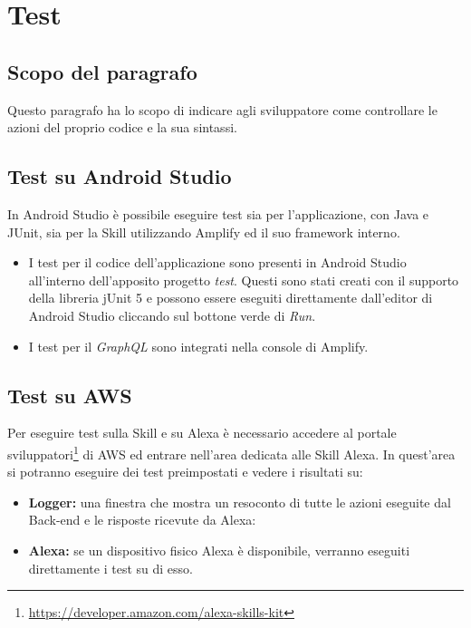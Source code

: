 \pagebreak

\section{Test}
\label{sec:test}
\subsection{Scopo del paragrafo}
Questo paragrafo ha lo scopo di indicare agli sviluppatore come controllare le azioni del proprio codice e la sua sintassi.

\subsection{Test su Android Studio}
In Android Studio è possibile eseguire test sia per l'applicazione, con Java e JUnit, sia per la Skill utilizzando Amplify ed il suo framework interno.
\begin{itemize}
    \item I test per il codice dell'applicazione sono presenti in Android Studio all'interno dell'apposito progetto \emph{test}. Questi sono stati creati con il supporto della libreria jUnit 5 e possono essere eseguiti direttamente dall'editor di Android Studio cliccando sul bottone verde di \emph{Run}.
    \item I test per il \emph{GraphQL} sono integrati nella console di Amplify.
\end{itemize}

\subsection{Test su AWS}
Per eseguire test sulla Skill e su Alexa è necessario accedere al portale sviluppatori\footnote{\href{https://developer.amazon.com/alexa-skills-kit}{https://developer.amazon.com/alexa-skills-kit}} di AWS ed entrare nell'area dedicata alle Skill Alexa. In quest'area si potranno eseguire dei test preimpostati e vedere i risultati su:
\begin{itemize}
    \item \textbf{Logger:} una finestra che mostra un resoconto di tutte le azioni eseguite dal Back-end e le risposte ricevute da Alexa:
    \item \textbf{Alexa:} se un dispositivo fisico Alexa è disponibile, verranno eseguiti direttamente i test su di esso.
\end{itemize}
